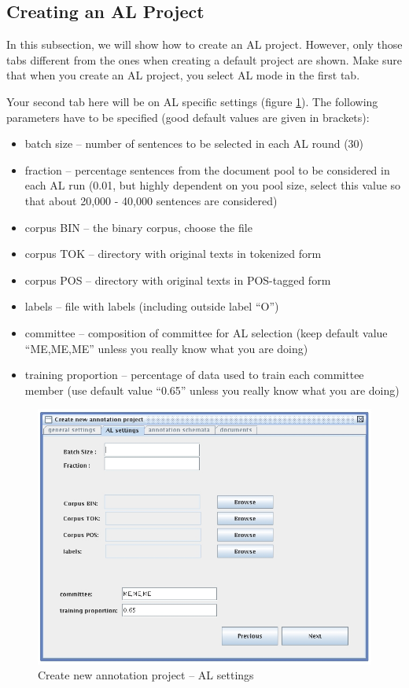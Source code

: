\documentclass[DIV12,english,11pt,halfparskip]{scrartcl}
\begin{document}
\subsection{Creating an AL Project}
In this subsection, we will show how to create an AL project. However,
only those tabs different from the ones when creating a default project
are shown. Make sure that when you create an AL project, you select AL
mode in the first tab.

Your second tab here will be on AL specific settings (figure
\ref{fig:createproject_ALsettings}). The following parameters have to
be specified (good default values are given in brackets):

\begin{itemize}
\item batch size -- number of sentences to be selected in each AL
  round (30)
\item fraction -- percentage sentences from the document pool to be
  considered in each AL run (0.01, but highly dependent on you pool
  size, select this value so that about 20,000 - 40,000 sentences are
  considered)
\item corpus BIN -- the binary corpus, choose the file
\item corpus TOK -- directory with original texts in tokenized form
\item corpus POS -- directory with original texts in POS-tagged form
\item labels -- file with labels (including outside label ``O'')
\item committee -- composition of committee for AL selection (keep
  default value ``ME,ME,ME'' unless you really know what you are doing)
\item training proportion -- percentage of data used to train each
  committee member (use default value ``0.65'' unless you really know
  what you are doing)
\end{itemize}


\begin{figure}[h]
  \centering
  \includegraphics[scale=0.5]{figs/CreateProjectALSettings.jpg}
  \caption{Create new annotation project -- AL settings}
  \label{fig:createproject_ALsettings}
\end{figure}
\end{document}
